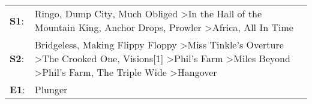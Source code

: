 \begin{supertabular}{p{0.03\textwidth}p{0.92\textwidth}}
 \textbf{S1}:  &                                                                                                                                                    Ringo\textsuperscript{}, \enspace Dump City\textsuperscript{}, \enspace Much Obliged\textsuperscript{} \textgreater \enspace In the Hall of the Mountain King\textsuperscript{}, \enspace Anchor Drops\textsuperscript{}, \enspace Prowler\textsuperscript{} \textgreater \enspace Africa\textsuperscript{}, \enspace All In Time\textsuperscript{}  \enspace  \\
 \textbf{S2}:  &  Bridgeless\textsuperscript{}, \enspace Making Flippy Floppy\textsuperscript{} \textgreater \enspace Miss Tinkle's Overture\textsuperscript{} \textgreater \enspace The Crooked One\textsuperscript{}, \enspace Visions[1]\textsuperscript{} \textgreater \enspace Phil's Farm\textsuperscript{} \textgreater \enspace Miles Beyond\textsuperscript{} \textgreater \enspace Phil's Farm\textsuperscript{}, \enspace The Triple Wide\textsuperscript{} \textgreater \enspace Hangover\textsuperscript{}  \enspace  \\
 \textbf{E1}:  &                                                                                                                                                                                                                                                                                                                                                                                                                                                                              Plunger\textsuperscript{}  \enspace  \\
\end{supertabular}
